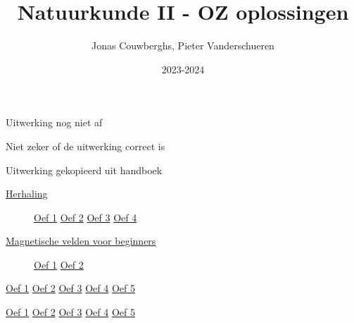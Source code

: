 \documentclass{article}
\title{Natuurkunde II - OZ oplossingen}
\author{Jonas Couwberghs, Pieter Vanderschueren}
\date{2023-2024}
\begin{document}
\setlength{\parindent}{0cm}

\maketitle

\begin{description}[labelwidth=1.4cm, leftmargin=!]
    \item[\textcolor{red}{Rood:}] Uitwerking nog niet af
    \item[\textcolor{orange}{Oranje:}] Niet zeker of de uitwerking correct is
    \item[\textcolor{yellow}{Geel:}] Uitwerking gekopieerd uit handboek
\end{description}

\begin{description}[labelwidth=0.5cm, leftmargin=!]
    \item[\hyperlink{section.1}{Oefenzitting 1:}] \leavevmode
        \begin{description}
            \item[\hyperlink{subsection.1.1}{Herhaling}]
                \hyperref[OZ1:herhaling:1]{Oef 1}
                \hyperref[OZ1:herhaling:2]{Oef 2}
                \hyperref[OZ1:herhaling:3]{Oef 3}
                \hyperref[OZ1:herhaling:4]{Oef 4}
            \item[\hyperlink{subsection.1.2}{Magnetische velden voor beginners}]
                \hyperref[OZ1:velden:1]{Oef 1}
                \hyperref[OZ1:velden:2]{Oef 2}
        \end{description}
        
    \item[\hyperlink{section.2}{Oefenzitting 2:}] \leavevmode
        \begin{description}
            \item
                \hyperref[OZ2:1]{Oef 1}
                \hyperref[OZ2:2]{Oef 2}
                \hyperref[OZ2:3]{Oef 3}
                \hyperref[OZ2:4]{{Oef 4}}
                \hyperref[OZ2:5]{Oef 5}
        \end{description}
    
    \item[\hyperlink{section.3}{Oefenzitting 3:}] \leavevmode
        \begin{description}
            \item
                \hyperref[OZ3:1]{Oef 1}
                \hyperref[OZ3:2]{Oef 2}
                \hyperref[OZ3:3]{Oef 3}
                \hyperref[OZ3:4]{Oef 4}
                \hyperref[OZ3:5]{Oef 5}
        \end{description}
        

\end{description}
\end{document}
